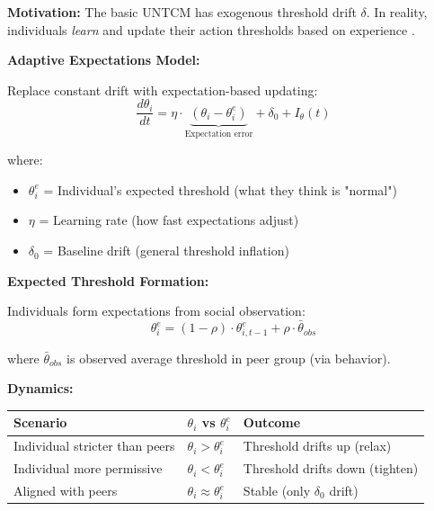 \begin{tcolorbox}[colback=purple!5!white, colframe=purple!75!black,
    title=\textbf{Extension UNTCM-X3: Adaptive Expectations for Threshold}]

\textbf{Motivation:} The basic UNTCM has exogenous threshold drift $\delta$. In reality, individuals \emph{learn} and update their action thresholds based on experience \citep{muth1961rational}.

\textbf{Adaptive Expectations Model:}

Replace constant drift with expectation-based updating:
\begin{equation}
\boxed{
\frac{d\theta_i}{dt} = \eta \cdot \underbrace{(\theta_i - \theta^e_i)}_{\text{Expectation error}} + \delta_0 + I_\theta(t)
}
\label{eq:adaptive-theta}
\end{equation}

where:
\begin{itemize}[nosep]
\item $\theta^e_i$ = Individual's expected threshold (what they think is "normal")
\item $\eta$ = Learning rate (how fast expectations adjust)
\item $\delta_0$ = Baseline drift (general threshold inflation)
\end{itemize}

\textbf{Expected Threshold Formation:}

Individuals form expectations from social observation:
\begin{equation}
\theta^e_i = (1-\rho) \cdot \theta^e_{i,t-1} + \rho \cdot \bar{\theta}_{obs}
\end{equation}

where $\bar{\theta}_{obs}$ is observed average threshold in peer group (via behavior).

\textbf{Dynamics:}

\begin{center}
\renewcommand{\arraystretch}{1.2}
\begin{tabular}{@{}lll@{}}
\toprule
\textbf{Scenario} & \textbf{$\theta_i$ vs $\theta^e_i$} & \textbf{Outcome} \\
\midrule
Individual stricter than peers & $\theta_i > \theta^e_i$ & Threshold drifts up (relax) \\
Individual more permissive & $\theta_i < \theta^e_i$ & Threshold drifts down (tighten) \\
Aligned with peers & $\theta_i \approx \theta^e_i$ & Stable (only $\delta_0$ drift) \\
\bottomrule
\end{tabular}
\end{center}


\end{tcolorbox}
